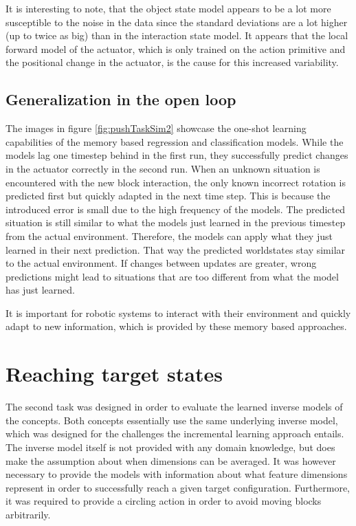 It is interesting to note, that the object state model appears to be a lot more 	susceptible to the noise in the data since the standard deviations are a lot higher (up to twice as big) than in the interaction state model. It appears that the local forward model of the actuator, which is only trained on the action primitive and the positional change in the actuator, is the cause for this increased variability.

\subsection{Generalization in the open loop} %

The images in figure \ref{fig:pushTaskSim2} showcase the one-shot learning capabilities of the memory based regression and classification models. While the models lag one timestep behind in the first run, they successfully predict changes in the actuator correctly in the second run. When an unknown situation is encountered with the new block interaction, the only known incorrect rotation is predicted first but quickly adapted in the next time step. This is because the introduced error is small due to the high frequency of the models. The predicted situation is still similar to what the models just learned in the previous timestep from the actual environment. Therefore, the models can apply what they just learned in their next prediction. That way the predicted worldstates stay similar to the actual environment.
If changes between updates are greater, wrong predictions might lead to situations that are too different from what the model has just learned.

It is important for robotic systems to interact with their environment and quickly adapt to new information, which is provided by these memory based approaches.

\section{Reaching target states}

The second task was designed in order to evaluate the learned inverse models of the concepts. Both concepts essentially use the same underlying inverse model, which was designed for the challenges the incremental learning approach entails. The inverse model itself is not provided with any domain knowledge, but does make the assumption about when dimensions can be averaged. It was however necessary to provide the models with information about what feature dimensions represent in order to successfully reach a given target configuration. Furthermore, it was required to provide a circling action in order to avoid moving blocks arbitrarily.

